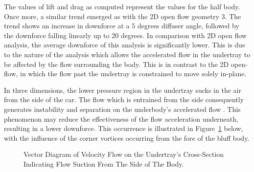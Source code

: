 \noindent The values of lift and drag as computed represent the values for the half body. Once more, a similar trend emerged as with the 2D open flow geometry 3. The trend shows an increase in downforce at a 5 degrees diffuser angle, followed by the downforce falling linearly up to 20 degrees. In comparison with 2D open flow analysis, the average downforce of this analysis is significantly lower. This is due to the nature of the analysis which allows the accelerated flow in the undertray to be affected by the flow surrounding the body. This is in contrast to the 2D open-flow, in which the flow past the undertray is constrained to move solely in-plane. 

\noindent In three dimensions, the lower pressure region in the undertray sucks in the air from the side of the car. The flow which is entrained from the side consequently generates instability and separation on the underbody's accelerated flow \cite{Bouferrouk2014OnVehicles}. This phenomenon may reduce the effectiveness of the flow acceleration underneath, resulting in a lower downforce. This occurrence is illustrated in Figure~\ref{fig:Vector_suction_diagram} below, with the influence of the corner vortices occurring from the fore of the bluff body. 

\begin{figure}[!htb]
    \centering
    \noindent{}
    \caption{Vector Diagram of Velocity Flow on the Undertray's Cross-Section Indicating Flow Suction From The Side of The Body.}
    \label{fig:Vector_suction_diagram}
\end{figure}

